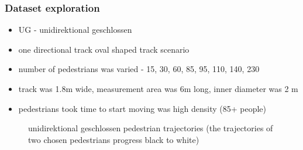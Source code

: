 \begin{frame}
    \frametitle{Dataset exploration}
    \begin{itemize}
        \item UG - unidirektional geschlossen 
        \item one directional track oval shaped track scenario
        \item number of pedestrians was varied - 15, 30, 60, 85, 95, 110, 140, 230
        \item track was 1.8m wide, measurement area was 6m long, inner diameter was 2 m
        \item pedestrians took time to start moving was high density (85+ people)
    \end{itemize}
    \begin{figure}
        \centering
    \end{figure}
\end{frame}

\begin{frame}
    \begin{figure}
        \centering
        \caption{unidirektional geschlossen pedestrian trajectories (the trajectories of two chosen pedestrians progress black to white)}
    \end{figure}
\end{frame}

